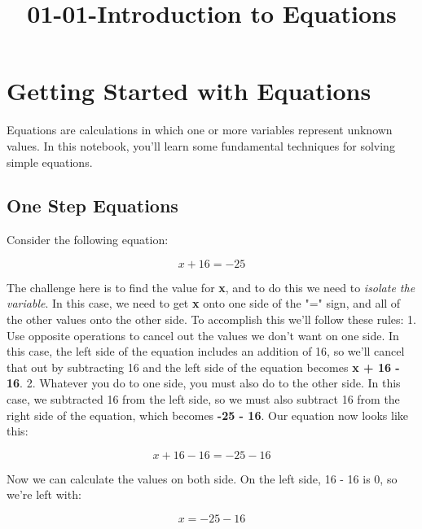 \documentclass[11pt]{article}
\title{01-01-Introduction to Equations}
\begin{document}
    
    
    \maketitle
    
    

    
    \section{Getting Started with
Equations}\label{getting-started-with-equations}

Equations are calculations in which one or more variables represent
unknown values. In this notebook, you'll learn some fundamental
techniques for solving simple equations.

\subsection{One Step Equations}\label{one-step-equations}

Consider the following equation:

\begin{equation}x + 16 = -25\end{equation}

The challenge here is to find the value for \textbf{x}, and to do this
we need to \emph{isolate the variable}. In this case, we need to get
\textbf{x} onto one side of the "=" sign, and all of the other values
onto the other side. To accomplish this we'll follow these rules: 1. Use
opposite operations to cancel out the values we don't want on one side.
In this case, the left side of the equation includes an addition of 16,
so we'll cancel that out by subtracting 16 and the left side of the
equation becomes \textbf{x + 16 - 16}. 2. Whatever you do to one side,
you must also do to the other side. In this case, we subtracted 16 from
the left side, so we must also subtract 16 from the right side of the
equation, which becomes \textbf{-25 - 16}. Our equation now looks like
this:

\begin{equation}x + 16 - 16 = -25 - 16\end{equation}

Now we can calculate the values on both side. On the left side, 16 - 16
is 0, so we're left with:

\begin{equation}x = -25 - 16\end{equation}
\end{document}
